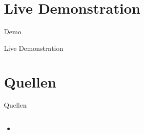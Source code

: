 \documentclass[10pt,fleqn]{beamer}
\begin{document}
\section{Live Demonstration}
\begin{frame}[t]{Demo}
	\begin{center}
		\begin{Huge}
			Live Demonstration
		\end{Huge}
	\end{center}
\end{frame}

\section{Quellen}
\begin{frame}{Quellen}
	\begin{columns}
		\begin{column}{16cm}	
			\begin{itemize}
				\item 
			\end{itemize}
		\end{column}
	\end{columns}
\end{frame}
\end{document}

